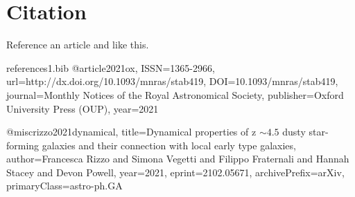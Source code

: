 \documentclass{article}
\begin{document}
\section{Citation}
Reference an article \cite{2021ox} and \cite{rizzo2021dynamical} like this.


\begin{filecontents}{references1.bib}
@article{2021ox, 
	ISSN={1365-2966},
	url={http://dx.doi.org/10.1093/mnras/stab419},
	DOI={10.1093/mnras/stab419},
	journal={Monthly Notices of the Royal Astronomical Society},
	publisher={Oxford University Press (OUP)},
	year={2021}
}

@misc{rizzo2021dynamical,
	title={Dynamical properties of z $\sim 4.5$ dusty star-forming galaxies and their connection with local early type galaxies}, 
	author={Francesca Rizzo and Simona Vegetti and Filippo Fraternali and Hannah Stacey and Devon Powell},
	year={2021},
	eprint={2102.05671},
	archivePrefix={arXiv},
	primaryClass={astro-ph.GA}
}
	
\end{filecontents} 

\nocite{*}


\end{document}
